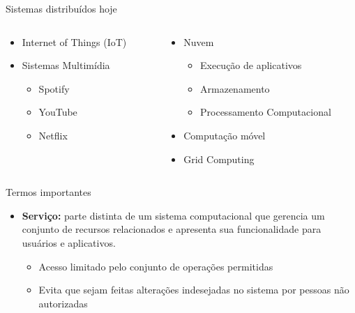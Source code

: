 \documentclass[aspectratio=169,
				xcolor=table]{beamer}
\begin{document}
	\begin{frame}{Sistemas distribuídos hoje}
		\begin{columns}[t]
			\begin{column}{0.5\textwidth}
				\begin{itemize}
					\item Internet of Things (IoT)
					\vspace{1em}
					\item Sistemas Multimídia 
					\begin{itemize}
						\item Spotify
						\item YouTube
						\item Netflix
					\end{itemize}
				\end{itemize}
			\end{column}
			\begin{column}{0.5\textwidth}
				\begin{itemize}
					\item Nuvem
					\begin{itemize}
						\item Execução de aplicativos
						\item Armazenamento
						\item Processamento Computacional
					\end{itemize}
					\vspace{1em}
					\item Computação móvel
					\vspace{1em}
					\item Grid Computing
				\end{itemize}
			\end{column}
		\end{columns}
	\end{frame}
	
	\begin{frame}{Termos importantes}
		\begin{itemize}
			\item \textbf{Serviço:} parte distinta de um sistema computacional que gerencia um conjunto de recursos relacionados e apresenta sua funcionalidade para usuários e aplicativos.
			\begin{itemize}
				\item Acesso limitado pelo conjunto de operações permitidas
				\item Evita que sejam feitas alterações indesejadas no sistema por pessoas não autorizadas
			\end{itemize}
		\end{itemize}
	\end{frame}
\end{document}
